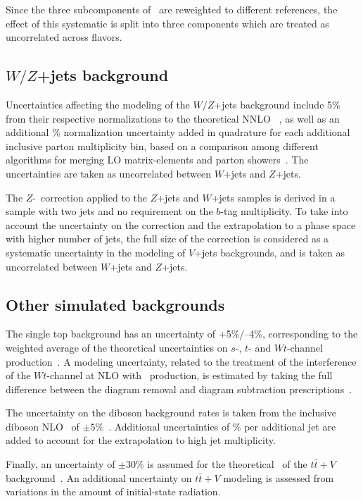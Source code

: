 Since the three subcomponents of \ttbar\ are reweighted to different references, the effect of
this systematic is split into three components which are treated as uncorrelated across flavors.

\subsection{$W/Z$+jets background}
Uncertainties affecting the modeling of the $W/Z$+jets background include 5\%  
from their respective normalizations to the theoretical NNLO \xsecs~\cite{Melnikov:2006kv}, 
as well as an additional \unit[24]{\%} normalization uncertainty added in quadrature for each additional 
inclusive parton multiplicity bin, based on a comparison among different algorithms 
for merging LO matrix-elements and parton showers~\cite{Alwall:2007fs}.
The uncertainties are taken as uncorrelated between $W$+jets and $Z$+jets. 

The $Z$-\pt\ correction applied to the $Z$+jets and $W$+jets samples is derived in a sample with two jets and no requirement on the $b$-tag multiplicity. To take into account the uncertainty on the correction and the extrapolation to a phase space with higher number of jets, the full size of the correction is considered as a systematic uncertainty in the modeling of $V$+jets backgrounds, and is taken as uncorrelated between $W$+jets and $Z$+jets.

\subsection{Other simulated backgrounds}
The single top background has an uncertainty of +5\%/--4\%, corresponding to the weighted average
of the theoretical uncertainties on $s$-, $t$- and $Wt$-channel production~\cite{stopxs,stopxs_2}.
A modeling uncertainty, related to the treatment of the interference of the $Wt$-channel at NLO with \ttbar\ production, is estimated by taking the full difference between the diagram removal and diagram subtraction prescriptions~\cite{Frixione:2008yi}.

The uncertainty on the diboson background rates is taken from the inclusive diboson NLO \xsec\ of $\pm 5\%$~\cite{dibosonxs}. 
Additional uncertainties of \unit[24]{\%} per additional jet are added to account for the extrapolation to high jet multiplicity.

Finally, an uncertainty of $\pm 30\%$ is assumed for the theoretical \xsecs\ of the 
$t\bar{t}+V$ background~\cite{ttbarVxs1,ttbarVxs2}.
An additional uncertainty on $t\bar{t}+V$
modeling is assessed from variations in the amount of initial-state radiation.  

